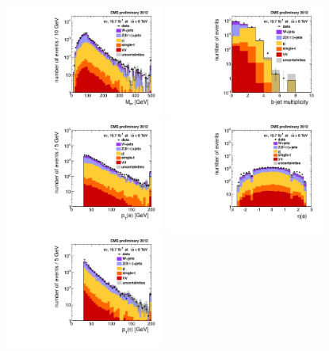 \documentclass[12pt]{thesis}  %
\begin{document}
\begin{figure}[hbtp]
  \begin{center}
    \includegraphics[width=0.465\textwidth]{figures/etau/etauMassMultJet.pdf}
    \includegraphics[width=0.465\textwidth]{figures/etau/nBJetMultJet.pdf} \\
    \includegraphics[width=0.465\textwidth]{figures/etau/elPtMultJet.pdf}
    \includegraphics[width=0.465\textwidth]{figures/etau/elEtaMultJet.pdf} \\
    \includegraphics[width=0.465\textwidth]{figures/etau/tauPtMultJet.pdf}

\end{center}
\end{figure}
\end{document}
